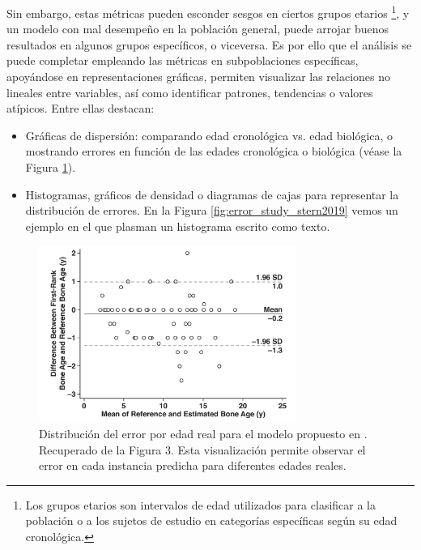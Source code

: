 Sin embargo, estas métricas pueden esconder sesgos en ciertos grupos etarios%
\footnote{
    Los grupos etarios son intervalos de edad utilizados para clasificar a la población o a los sujetos de estudio en categorías específicas según su edad cronológica.
}, 
y un modelo con mal desempeño en la población general, puede arrojar buenos resultados en algunos grupos específicos, o viceversa. Es por ello que el análisis se puede completar empleando las métricas en subpoblaciones específicas, apoyándose en representaciones gráficas, permiten visualizar las relaciones no lineales entre variables, así como identificar patrones, tendencias o valores atípicos. Entre ellas destacan: 

\begin{itemize}

    \item Gráficas de dispersión: comparando edad cronológica vs. edad biológica, o mostrando errores en función de las edades cronológica o biológica (véase la Figura \ref{fig:error_distribution_by_age}).

    \item Histogramas, gráficos de densidad o diagramas de cajas para representar la distribución de errores. En la Figura \ref{fig:error_study_stern2019} vemos un ejemplo en el que plasman un histograma escrito como texto.

\end{itemize}

\begin{figure}[htbp]
    \centering
    \includegraphics[width=0.75\textwidth]{capitulos/cap_03/imagenes/error_distribution.png}
    \caption[
        Distribución del error por edad real para el modelo propuesto en \cite{kim2017}. 
    ]{
        Distribución del error por edad real para el modelo propuesto en \cite{kim2017}. 
        Recuperado de la Figura 3.  
        Esta visualización permite observar el error en cada instancia predicha para diferentes edades reales. 
    }
    \label{fig:error_distribution_by_age}
\end{figure}

